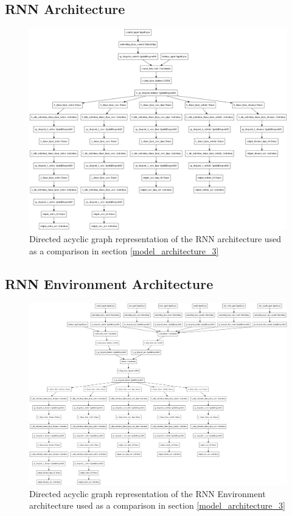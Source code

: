 \subsection{RNN Architecture}
\begin{figure}[H]
\centering
\includegraphics[width=\textwidth,height=0.8\textheight,keepaspectratio]{images/appendix_B/rnn_3.png}
\caption[\textbf{RNN DAG - Section \ref{model_architecture_3}}]{Directed acyclic graph representation of the RNN architecture used as a comparison in section \ref{model_architecture_3}}
\label{rnn_3_dag}
\end{figure}

\subsection{RNN Environment Architecture}
\begin{figure}[H]
\centering
\includegraphics[width=\textwidth,height=0.8\textheight,keepaspectratio]{images/appendix_B/rnn_env_3.png}
\caption[\textbf{RNN Environment DAG - Section \ref{model_architecture_3}}]{Directed acyclic graph representation of the RNN Environment architecture used as a comparison in section \ref{model_architecture_3}}
\label{rnn_env_dag}
\end{figure}

